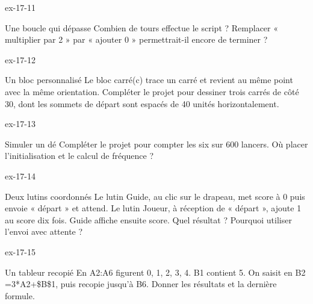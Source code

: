 \clearpage{}
\begin{blocLivre}{ex-17-11}\begin{exercice}[3]{Une boucle qui dépasse}
Combien de tours effectue le script ? Remplacer « multiplier par 2 » par « ajouter 0 » permettrait-il encore de terminer ?
\label{fig-ex-17-11}
\end{exercice}\end{blocLivre}
\begin{blocLivre}{ex-17-12}\begin{exercice}[3]{Un bloc personnalisé}
Le bloc carré(c) trace un carré et revient au même point avec la même orientation. Compléter le projet pour dessiner trois carrés de côté 30, dont les sommets de départ sont espacés de 40 unités horizontalement.
\label{fig-ex-17-12}
\end{exercice}\end{blocLivre}
\begin{blocLivre}{ex-17-13}\begin{exercice}[3]{Simuler un dé}
Compléter le projet pour compter les six sur 600 lancers. Où placer l’initialisation et le calcul de fréquence ?
\label{fig-ex-17-13}
\end{exercice}\end{blocLivre}
\begin{blocLivre}{ex-17-14}\begin{exercice}[3]{Deux lutins coordonnés}
Le lutin Guide, au clic sur le drapeau, met score à 0 puis envoie « départ » et attend. Le lutin Joueur, à réception de « départ », ajoute 1 au score dix fois. Guide affiche ensuite score. Quel résultat ? Pourquoi utiliser l’envoi avec attente ?
\label{fig-ex-17-14}
\end{exercice}\end{blocLivre}
\begin{blocLivre}{ex-17-15}\begin{exercice}[3]{Un tableur recopié}
En A2:A6 figurent 0, 1, 2, 3, 4. B1 contient 5. On saisit en B2 =3*A2+\$B\$1, puis recopie jusqu’à B6. Donner les résultats et la dernière formule.
\label{fig-ex-17-15}
\end{exercice}\end{blocLivre}

\clearpage
